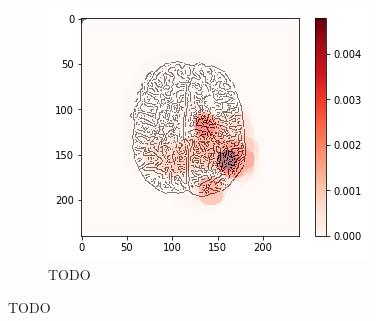 \begin{figure}[H]
        \begin{subfigure}{.33\textwidth}
        \centering
        \includegraphics[width=\linewidth]{chapters/06_hdm/circle20/3.png}
        \caption{TODO}
    \end{subfigure}
    \caption{TODO}
\end{figure}

